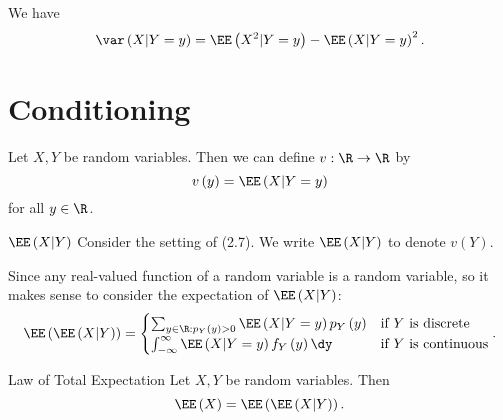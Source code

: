 \documentclass[stat333]{subfiles}
\begin{document}
    \begin{prop}{}
        We have
        \begin{equation*}
            \var\left( X|Y=y \right)=\EE\left( X^{2}|Y=y \right)-\EE\left( X|Y=y \right)^{2}.
        \end{equation*}
    \end{prop}

    \section{Conditioning}

    \np Let $X,Y$ be random variables. Then we can define $v:\R\to\R$ by
    \begin{equation*}
        v\left( y \right) = \EE\left( X|Y=y \right)
    \end{equation*}
    for all $y\in\R$.

    \begin{notation}{$\EE\left( X|Y \right)$}{}
        Consider the setting of (2.7). We write $\EE\left( X|Y \right)$ to denote $v\left( Y \right)$.
    \end{notation}

    \noindent Since any real-valued function of a random variable is a random variable, so it makes sense to consider the expectation of $\EE\left( X|Y \right)$:
    \begin{equation}
        \EE\left( \EE\left( X|Y \right) \right) =
        \begin{cases} 
            \sum^{}_{y\in\R:p_Y\left( y \right)>0} \EE\left( X|Y=y \right)p_Y\left( y \right) & \text{if $Y$ is discrete} \\
            \int^{\infty}_{-\infty}\EE\left( X|Y=y \right)f_Y\left( y \right)\dy & \text{if $Y$ is continuous}
        \end{cases}.
    \end{equation}

    \begin{theorem}{Law of Total Expectation}
        Let $X,Y$ be random variables. Then
        \begin{equation*}
            \EE\left( X \right) = \EE\left( \EE\left( X|Y \right) \right).
        \end{equation*}
    \end{theorem}
\end{document}
